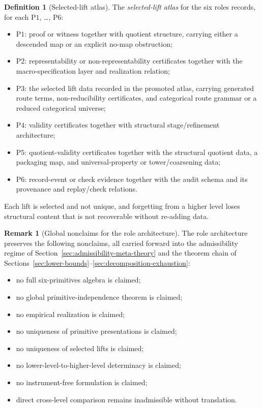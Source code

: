 \documentclass[11pt]{article}
\theoremstyle{definition}
\newtheorem{definition}[theorem]{Definition}
\newtheorem{remark}[theorem]{Remark}
\newcommand{\Pone}{\ensuremath{\mathrm{P1}}}
\newcommand{\Ptwo}{\ensuremath{\mathrm{P2}}}
\newcommand{\Pthree}{\ensuremath{\mathrm{P3}}}
\newcommand{\Pfour}{\ensuremath{\mathrm{P4}}}
\newcommand{\Pfive}{\ensuremath{\mathrm{P5}}}
\newcommand{\Psix}{\ensuremath{\mathrm{P6}}}
\begin{document}
\begin{definition}[Selected-lift atlas]\label{def:selected-lift-atlas}
The \emph{selected-lift atlas} for the six roles records, for each
\Pone{}, \ldots, \Psix{}:
\begin{itemize}[topsep=2pt,itemsep=1pt]
  \item \Pone{}: proof or witness together with quotient structure, carrying
    either a descended map or an explicit no-map obstruction;
  \item \Ptwo{}: representability or non-representability certificates
    together with the macro-specification layer and realization relation;
  \item \Pthree{}: the selected lift data recorded in the promoted atlas,
    carrying generated route terms, non-reducibility certificates, and
    categorical route grammar or a reduced categorical universe;
  \item \Pfour{}: validity certificates together with structural
    stage/refinement architecture;
  \item \Pfive{}: quotient-validity certificates together with the
    structural quotient data, a packaging map, and universal-property or
    tower/coarsening data;
  \item \Psix{}: record-event or check evidence together with the audit
    schema and its provenance and replay/check relations.
\end{itemize}
Each lift is selected and not unique, and forgetting from a higher level
loses structural content that is not recoverable without re-adding data.
\end{definition}

\begin{remark}[Global nonclaims for the role architecture]\label{rem:atlas-global-nonclaims}
The role architecture preserves the following nonclaims, all carried
forward into the admissibility regime of
Section~\ref{sec:admissibility-meta-theory} and the theorem chain of
Sections~\ref{sec:lower-bounds}--\ref{sec:decomposition-exhaustion}:
\begin{itemize}[topsep=2pt,itemsep=1pt]
  \item no full six-primitives algebra is claimed;
  \item no global primitive-independence theorem is claimed;
  \item no empirical realization is claimed;
  \item no uniqueness of primitive presentations is claimed;
  \item no uniqueness of selected lifts is claimed;
  \item no lower-level-to-higher-level determinacy is claimed;
  \item no instrument-free formulation is claimed;
  \item direct cross-level comparison remains inadmissible without
    translation.
\end{itemize}
\end{remark}
\end{document}
